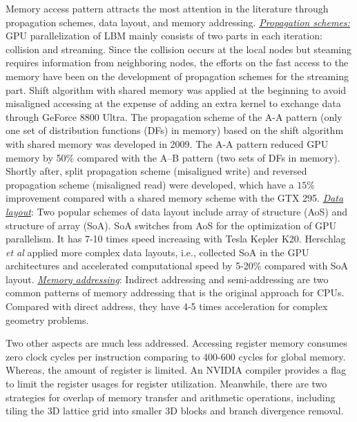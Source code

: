 \documentclass[10pt]{elsarticle}
\begin{document}
Memory access pattern attracts the most attention in the literature through propagation schemes, data layout, and memory addressing. \underline{\textit{Propagation schemes:}}
GPU parallelization of LBM mainly consists of two parts in each iteration: collision and streaming. Since the collision occurs at the local nodes but steaming requires information from neighboring nodes, the efforts on the fast access to the memory have been on the development of propagation schemes\cite{rf:Wittmann13} for the streaming part. 
Shift algorithm with shared memory \cite{rf:Tolke08_IJCFD,rf:Tolke10} was applied at the beginning to avoid misaligned accessing at the expense of adding an extra kernel to exchange data through GeForce 8800 Ultra. The propagation scheme of the A-A pattern (only one set of distribution functions (DFs) in memory) based on the shift algorithm with shared memory was developed\cite{rf:Bailey09} in 2009. The A-A pattern reduced GPU memory by 50\% compared with the A–B pattern (two sets of DFs in memory). Shortly after, split propagation scheme (misaligned write) and reversed propagation scheme (misaligned read) \cite{rf:Obrecht11} were developed, which have a $15\%$ improvement compared with a shared memory scheme with the GTX 295.  
\underline{\textit{Data layout}}: Two popular schemes of data layout include array of structure (AoS) and structure of array (SoA). SoA switches from AoS for the optimization of GPU parallelism\cite{rf:Ryoo08}. It has 7-10 times speed increasing with Tesla Kepler K20\cite{rf:Tran17}. Herschlag {\it et al}\cite{rf:Herschlag18} applied more complex data layouts, i.e., collected SoA in the GPU architectures and accelerated computational speed by 5-20\% compared with SoA layout. 
\underline{\textit{Memory addressing}}: Indirect addressing and semi-addressing are two common patterns of memory addressing that is the original approach for CPUs. Compared with direct address\cite{ rf:Herschlag18}, they have 4-5 times acceleration for complex geometry problems. 

Two other aspects are much less addressed. Accessing register memory consumes zero clock cycles per instruction comparing to 400-600 cycles for global memory. Whereas, the amount of register is limited. An NVIDIA compiler provides a flag to limit the register usages for register utilization\cite{rf:Nvidia15}. Meanwhile, there are two strategies for overlap of memory transfer and arithmetic operations, including tiling the 3D lattice grid into smaller 3D blocks and branch divergence removal\cite{rf:Tran17}.
\end{document}
